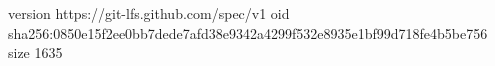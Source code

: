 version https://git-lfs.github.com/spec/v1
oid sha256:0850e15f2ee0bb7dede7afd38e9342a4299f532e8935e1bf99d718fe4b5be756
size 1635
